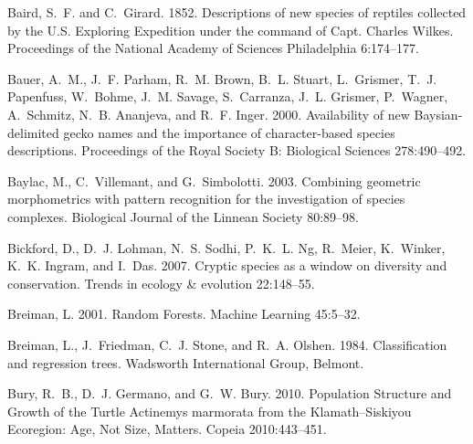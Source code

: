 \documentclass[12pt,letterpaper]{article}
\begin{document}
\begin{thebibliography}{77}
        Baird, S.~F. and C.~Girard. 1852. {Descriptions of new species of reptiles
          collected by the U.S. Exploring Expedition under the command of Capt. Charles
        Wilkes}. Proceedings of the National Academy of Sciences Philadelphia
        6:174--177.

        Bauer, A.~M., J.~F. Parham, R.~M. Brown, B.~L. Stuart, L.~Grismer, T.~J.
        Papenfuss, W.~Bohme, J.~M. Savage, S.~Carranza, J.~L. Grismer, P.~Wagner,
        A.~Schmitz, N.~B. Ananjeva, and R.~F. Inger. 2000. {Availability of new
          Baysian-delimited gecko names and the importance of character-based species
        descriptions}. Proceedings of the Royal Society B: Biological Sciences
        278:490--492.

        Baylac, M., C.~Villemant, and G.~Simbolotti. 2003. {Combining geometric
          morphometrics with pattern recognition for the investigation of species
        complexes}. Biological Journal of the Linnean Society 80:89--98.

        Bickford, D., D.~J. Lohman, N.~S. Sodhi, P.~K.~L. Ng, R.~Meier, K.~Winker,
        K.~K. Ingram, and I.~Das. 2007. {Cryptic species as a window on diversity and
        conservation.} Trends in ecology \& evolution 22:148--55.

        Breiman, L. 2001. {Random Forests}. Machine Learning 45:5--32.

        Breiman, L., J.~Friedman, C.~J. Stone, and R.~A. Olshen. 1984. {Classification
        and regression trees}. Wadsworth International Group, Belmont.

        Bury, R.~B., D.~J. Germano, and G.~W. Bury. 2010. {Population Structure and
          Growth of the Turtle Actinemys marmorata from the Klamath–Siskiyou
        Ecoregion: Age, Not Size, Matters}. Copeia 2010:443--451.


\end{thebibliography}
\end{document}
